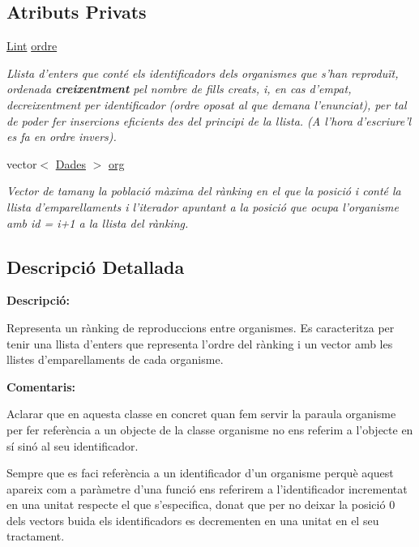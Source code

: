 \subsection*{Atributs Privats}
\begin{DoxyCompactItemize}
\item 
\hyperlink{class_ranking_ae94c085922b0f7f31630308dcb2a61ba}{Lint} \hyperlink{class_ranking_af527b6037110e19fda60fb4e100b7750}{ordre}
\begin{DoxyCompactList}\small\item\em Llista d'enters que conté els identificadors dels organismes que s'han reproduït, ordenada {\bfseries creixentment} pel nombre de fills creats, i, en cas d'empat, decreixentment per identificador (ordre oposat al que demana l'enunciat), per tal de poder fer insercions eficients des del principi de la llista. (A l'hora d'escriure'l es fa en ordre invers). \end{DoxyCompactList}\item 
vector$<$ \hyperlink{struct_ranking_1_1_dades}{Dades} $>$ \hyperlink{class_ranking_a89de97e7542e8989c241113a4ee2498f}{org}
\begin{DoxyCompactList}\small\item\em Vector de tamany la població màxima del rànking en el que la posició {\itshape i} conté la llista d'emparellaments i l'iterador apuntant a la posició que ocupa l'organisme amb id = {\itshape i+1} a la llista del rànking. \end{DoxyCompactList}\end{DoxyCompactItemize}


\subsection{Descripció Detallada}
{\bfseries Descripció\-:}\par
 Representa un rànking de reproduccions entre organismes. Es caracteritza per tenir una llista d'enters que representa l'ordre del rànking i un vector amb les llistes d'emparellaments de cada organisme. 

{\bfseries Comentaris\-:} 
\begin{DoxyItemize}
\item Aclarar que en aquesta classe en concret quan fem servir la paraula organisme per fer referència a un objecte de la classe organisme no ens referim a l'objecte en sí sinó al seu identificador.  
\item Sempre que es faci referència a un identificador d'un organisme perquè aquest apareix com a paràmetre d'una funció ens referirem a l'identificador incrementat en una unitat respecte el que s'especifica, donat que per no deixar la posició 0 dels vectors buida els identificadors es decrementen en una unitat en el seu tractament.  
\end{DoxyItemize}

